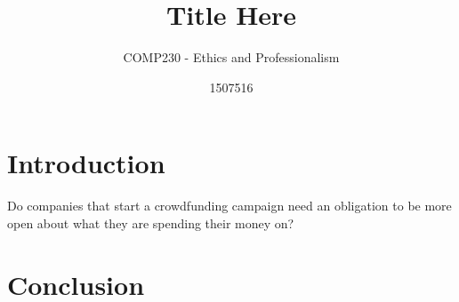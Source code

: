 \documentclass{scrartcl}
\title{Title Here}
\subtitle{COMP230 - Ethics and Professionalism}
\author{1507516}
\begin{document}
\maketitle

\abstract{}

\section{Introduction}

Do companies that start a crowdfunding campaign need an obligation to be more open about what they are spending their money on?


\section{}


\section{Conclusion}




\end{document}
